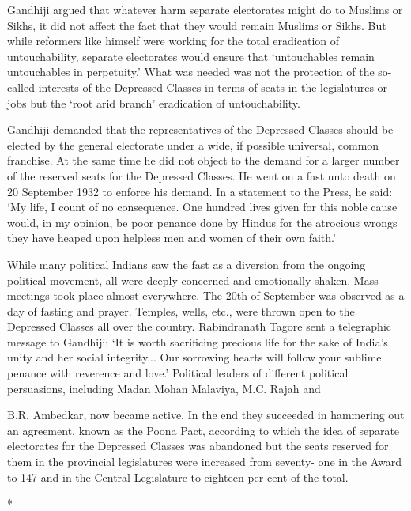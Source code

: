 Gandhiji argued that whatever harm separate electorates might do to Muslims or Sikhs, it did not affect the fact that they would remain Muslims or Sikhs. But while reformers like himself were working for the total eradication of untouchability, separate electorates would ensure that `untouchables remain untouchables in perpetuity.' What was needed was not the protection of the so-called interests of the Depressed Classes in terms of seats in the legislatures or jobs but the `root arid branch' eradication of untouchability. 

Gandhiji demanded that the representatives of the Depressed Classes should be elected by the general electorate under a wide, if possible universal, common franchise. At the same time he did not object to the demand for a larger number of the reserved seats for the Depressed Classes. He went on a fast unto death on 20 September 1932 to enforce his demand. In a statement to the Press, he said: `My life, I count of no consequence. One hundred lives given for this noble cause would, in my opinion, be poor penance done by Hindus for the atrocious wrongs they have heaped upon helpless men and women of their own faith.' 

While many political Indians saw the fast as a diversion from the ongoing political movement, all were deeply concerned and emotionally shaken. Mass meetings took place almost everywhere. The 20th of September was observed as a day of fasting and prayer. Temples, wells, etc., were thrown open to the Depressed Classes all over the country. Rabindranath Tagore sent a telegraphic message to Gandhiji: `It is worth sacrificing precious life for the sake of India's unity and her social integrity... Our sorrowing hearts will follow your sublime penance with reverence and love.' Political leaders of different political persuasions, including Madan Mohan Malaviya, M.C. Rajah and 

B.R. Ambedkar, now became active. In the end they succeeded in hammering out an agreement, known as the Poona Pact, according to which the idea of separate electorates for the Depressed Classes was abandoned but the seats reserved for them in the provincial legislatures were increased from seventy- one in the Award to 147 and in the Central Legislature to eighteen per cent of the total.

\begin{center}*\end{center}

\paragraph*{}


